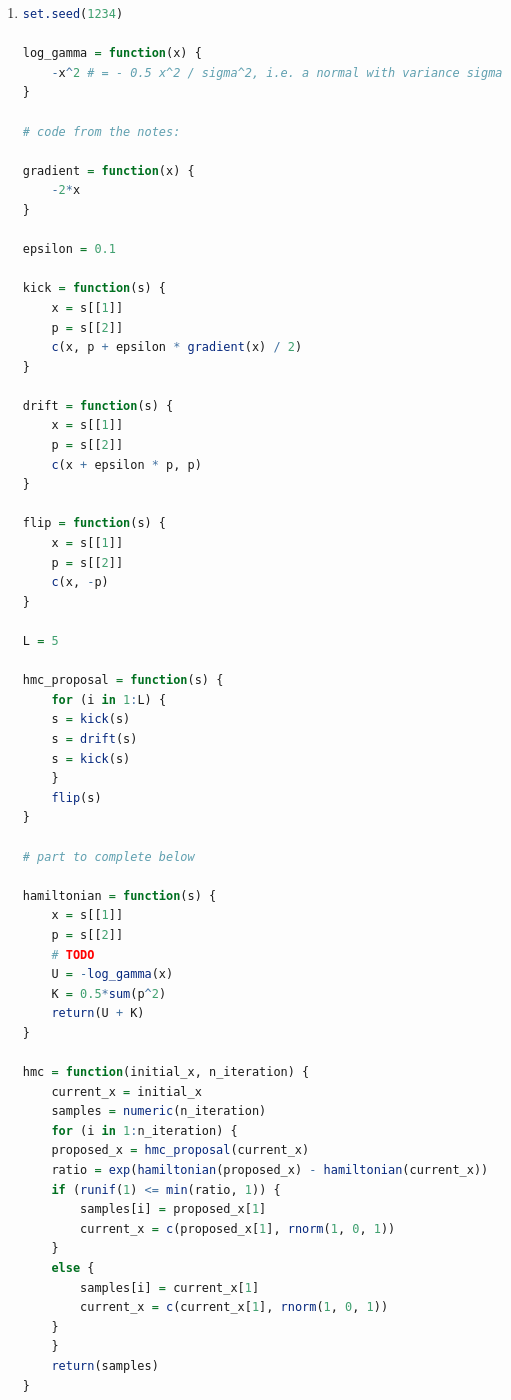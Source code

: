 \documentclass{article}
\begin{document}
\begin{enumerate}
\item 
\begin{lstlisting}[language=R]
set.seed(1234)

log_gamma = function(x) {
    -x^2 # = - 0.5 x^2 / sigma^2, i.e. a normal with variance sigma^2 = 0.5
}

# code from the notes:

gradient = function(x) {
    -2*x
}

epsilon = 0.1

kick = function(s) {
    x = s[[1]]
    p = s[[2]]
    c(x, p + epsilon * gradient(x) / 2)
}

drift = function(s) {
    x = s[[1]]
    p = s[[2]]
    c(x + epsilon * p, p)
}

flip = function(s) {
    x = s[[1]]
    p = s[[2]]
    c(x, -p)
}

L = 5

hmc_proposal = function(s) {
    for (i in 1:L) {
    s = kick(s)
    s = drift(s)
    s = kick(s)
    }
    flip(s)
}

# part to complete below

hamiltonian = function(s) {
    x = s[[1]]
    p = s[[2]]
    # TODO
    U = -log_gamma(x)
    K = 0.5*sum(p^2)
    return(U + K)
}

hmc = function(initial_x, n_iteration) {
    current_x = initial_x
    samples = numeric(n_iteration)
    for (i in 1:n_iteration) {
    proposed_x = hmc_proposal(current_x)
    ratio = exp(hamiltonian(proposed_x) - hamiltonian(current_x))
    if (runif(1) <= min(ratio, 1)) {
        samples[i] = proposed_x[1]
        current_x = c(proposed_x[1], rnorm(1, 0, 1))
    }
    else {
        samples[i] = current_x[1]
        current_x = c(current_x[1], rnorm(1, 0, 1))
    }
    }
    return(samples)
}
\end{lstlisting}



\end{enumerate}
\end{document}

